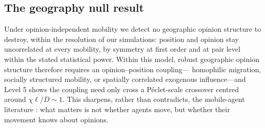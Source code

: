 \documentclass[5p,times,twocolumn]{elsarticle}
\begin{document}
\subsection{The geography null result} Under opinion-independent mobility
we detect no geographic opinion structure to destroy, within the
resolution of our simulations: position and opinion stay uncorrelated at
every mobility, by symmetry at first order and at pair level within the
stated statistical power. Within this model, robust geographic opinion
structure therefore requires an opinion--position coupling---%
homophilic migration, socially structured mobility, or spatially
correlated exogenous influence---and Level 5 shows the coupling need only
cross a P\'eclet-scale crossover centred around $\chi\ell/D \sim 1$.
This sharpens,
rather than contradicts, the mobile-agent literature
\citep{alraddadi2024, pasimeni2025}: what matters is not whether agents
move, but whether their movement knows about opinions.
\end{document}
